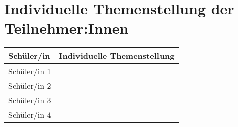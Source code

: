 \chapter*{Individuelle Themenstellung der Teilnehmer:Innen}

\begin{table}[H]
    \centering
    \begin{tabular}{|p{4cm}|p{8cm}|}
        \hline
        \textbf{Schüler/in} & \textbf{Individuelle Themenstellung} \\
        \hline
        Schüler/in 1 & \\[2cm]
        \hline
        Schüler/in 2 & \\[2cm]
        \hline
        Schüler/in 3 & \\[2cm]
        \hline
        Schüler/in 4 & \\[2cm]
        \hline
    \end{tabular}
\end{table}